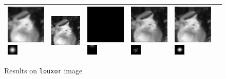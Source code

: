 \begin{figure}
\begin{tabular}{|l|l|l|l|l|l|}
 \hline\includegraphics[width=2.5cm]{results/louxor_kernelgauss_blurred.png}
\includegraphics[width=0.5cm]{images/kernelgauss}
& \includegraphics[width=2.5cm]{results/louxor_kernelgauss_nonblind_deconv.png}
&\includegraphics[width=2.5cm]{results/louxor_kernelgauss_MAPxk_x.png}
\includegraphics[width=0.5cm]{results/louxor_kernelgauss_MAPxk_k.png}
&\includegraphics[width=2.5cm]{results/louxor_kernelgauss_MAPk_x.png}
\includegraphics[width=0.5cm]{results/louxor_kernelgauss_MAPk_k.png}
&\includegraphics[width=2.5cm]{results/louxor_kernelgauss_MAPkreg_x.png}
\includegraphics[width=0.5cm]{results/louxor_kernelgauss_MAPkreg_k.png}
\\ 
 \hline\end{tabular} 

    \caption{Results on \texttt{louxor} image}\label{fig:results_louxor}
    \end{figure}
